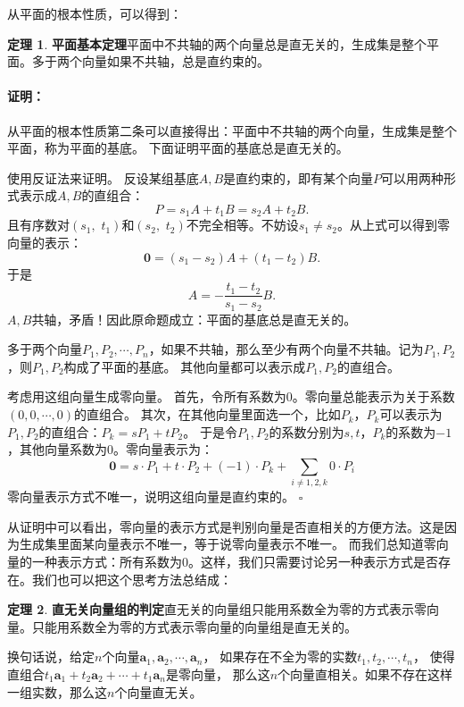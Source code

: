 \documentclass[12pt,UTF8]{ctexbook}
\theoremstyle{definition}
\newtheorem{tm}{定理}[section]
\theoremstyle{plain}
\renewenvironment{proof}{\paragraph{\textbf{证明：}}}{\hfill$\square$}
\begin{document}
从平面的根本性质，可以得到：
\begin{tm}{\textbf{平面基本定理}}\label{tm:0-0-20}
    平面中不共轴的两个向量总是直无关的，生成集是整个平面。多于两个向量如果不共轴，总是直约束的。
\end{tm}
\begin{proof}
    从平面的根本性质第二条可以直接得出：平面中不共轴的两个向量，生成集是整个平面，称为平面的基底。
    下面证明平面的基底总是直无关的。
    
    使用反证法来证明。
    反设某组基底$A,B$是直约束的，即有某个向量$P$可以用两种形式表示成$A,B$的直组合：
    $$ P = s_1A + t_1B = s_2A + t_2B. $$
    且有序数对$(s_1, \,\,t_1)$和$(s_2, \,\,t_2)$不完全相等。不妨设$s_1 \neq s_2$。从上式可以得到零向量的表示：
    $$ \mathbf{0} = (s_1 - s_2)A + (t_1 - t_2)B.$$
    于是
    $$ A = -\frac{t_1 - t_2}{s_1 - s_2} B.$$
    $A, B$共轴，矛盾！因此原命题成立：平面的基底总是直无关的。

    多于两个向量$P_1, P_2, \cdots , P_n$，如果不共轴，那么至少有两个向量不共轴。记为$P_1, P_2$，则$P_1, P_2$构成了平面的基底。
    其他向量都可以表示成$P_1, P_2$的直组合。
    
    考虑用这组向量生成零向量。
    首先，令所有系数为$0$。零向量总能表示为关于系数$(0,0,\cdots,0)$的直组合。
    其次，在其他向量里面选一个，比如$P_k$，$P_k$可以表示为$P_1, P_2$的直组合：$P_k = sP_1 + tP_2$。
    于是令$P_1,P_2$的系数分别为$s,t$，$P_k$的系数为$-1$，其他向量系数为$0$。零向量表示为：
    $$ \mathbf{0} = s\cdot P_1 + t\cdot P_2 + (-1)\cdot P_k + \sum_{i\neq 1,2,k} 0\cdot P_i$$
    零向量表示方式不唯一，说明这组向量是直约束的。
\end{proof}

从证明中可以看出，零向量的表示方式是判别向量是否直相关的方便方法。这是因为生成集里面某向量表示不唯一，等于说零向量表示不唯一。
而我们总知道零向量的一种表示方式：所有系数为$0$。这样，我们只需要讨论另一种表示方式是否存在。我们也可以把这个思考方法总结成：

\begin{tm}{\textbf{直无关向量组的判定}}\label{tm:0-0-25}
    直无关的向量组只能用系数全为零的方式表示零向量。只能用系数全为零的方式表示零向量的向量组是直无关的。
\end{tm}

换句话说，给定$n$个向量$\mathbf{a}_1, \mathbf{a}_2, \cdots , \mathbf{a}_n$，
如果存在不全为零的实数$t_1, t_2, \cdots , t_n$，
使得直组合$t_1\mathbf{a}_1 + t_2\mathbf{a}_2 + \cdots + t_1\mathbf{a}_n$是零向量，
那么这$n$个向量直相关。如果不存在这样一组实数，那么这$n$个向量直无关。
\end{document}
